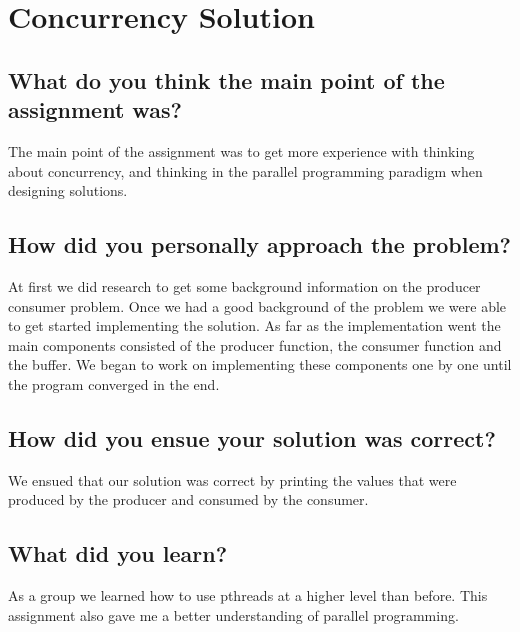 \documentclass[draftclsnofoot,onecolumn,10pt,compsoc]{IEEEtran}
\begin{document}
\section{Concurrency Solution}
\subsection{What do you think the main point of the assignment was?}
The main point of the assignment was to get more experience with thinking about
concurrency, and thinking in the parallel programming paradigm when designing solutions.  
\subsection{How did you personally approach the problem?}
At first we did research to get some background information on the producer
consumer problem. Once we had a good background of the problem we were able to
get started implementing the solution. As far as the implementation went the main
components consisted of the producer function, the consumer function and the
buffer. We began to work on implementing these components one by one until the
program converged in the end. 
\subsection{How did you ensue your solution was correct?}
We ensued that our solution was correct by printing the values that were
produced by the producer and consumed by the consumer. 
\subsection{What did you learn?}
As a group we learned how to use pthreads at a higher level than before. This
assignment also gave me a better understanding of parallel programming. 
\end{document}
